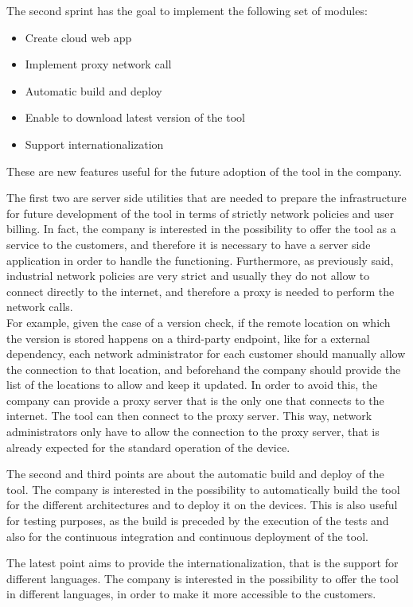 The second sprint has the goal to implement the following set of modules:

\begin{itemize}
  \item Create cloud web app
  \item Implement proxy network call
  \item Automatic build and deploy
  \item Enable to download latest version of the tool
  \item Support internationalization
\end{itemize}

These are new features useful for the future adoption of the tool in the company.

The first two are server side utilities that are needed to prepare the infrastructure for future development of the tool in terms of strictly network policies and user billing. In fact, the company is interested in the possibility to offer the tool as a service to the customers, and therefore it is necessary to have a server side application in order to handle the functioning. Furthermore, as previously said, industrial network policies are very strict and usually they do not allow to connect directly to the internet, and therefore a proxy is needed to perform the network calls. \\
For example, given the case of a version check, if the remote location on which the version is stored happens on a third-party endpoint, like for a external dependency, each network administrator for each customer should manually allow the connection to that location, and beforehand the company should provide the list of the locations to allow and keep it updated. In order to avoid this, the company can provide a proxy server that is the only one that connects to the internet. The tool can then connect to the proxy server. This way, network administrators only have to allow the connection to the proxy server, that is already expected for the standard operation of the device.

The second and third points are about the automatic build and deploy of the tool. The company is interested in the possibility to automatically build the tool for the different architectures and to deploy it on the devices. This is also useful for testing purposes, as the build is preceded by the execution of the tests and also for the continuous integration and continuous deployment of the tool.

The latest point aims to provide the internationalization, that is the support for different languages. The company is interested in the possibility to offer the tool in different languages, in order to make it more accessible to the customers.

